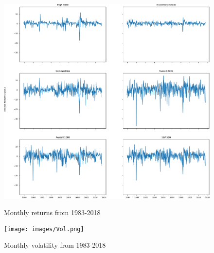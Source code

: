 \documentclass[11pt,a4paper,oneside]{article}
\begin{document}
\begin{figure}[ht]
\center
\caption{Monthly returns from 1983-2018}
\vspace{-0mm}
\label{mth_returns}
\includegraphics[width=\textwidth,height=\textheight,keepaspectratio]{images/ExcessReturns.pdf}
\begingroup
\vspace{-14mm}
\endgroup
\end{figure}

\clearpage

\begin{figure}[ht]
\center
\caption{Monthly volatility from 1983-2018}
\vspace{-0mm}
\label{mth_vol}
\texttt{[image: images/Vol.png]}
\begingroup
\vspace{-14mm}
\endgroup
\end{figure}

\clearpage
\end{document}
